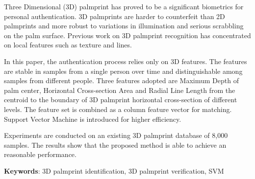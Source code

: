 Three Dimensional (3D) palmprint has proved to be a significant biometrics for personal authentication. 3D palmprints are harder to counterfeit than 2D palmprints and more robust to variations in illumination and serious scrabbling on the palm surface. Previous work on 3D palmprint recognition has concentrated on local features such as texture and lines.

In this paper, the authentication process relies only on 3D features. The features are stable in samples from a single person over time and distinguishable among samples from different people. Three features adopted are Maximum Depth of palm center, Horizontal Cross-section Area and Radial Line Length from the centroid to the boundary of 3D palmprint horizontal cross-section of different levels. The feature set is combined as a column feature vector for matching. Support Vector Machine is introduced for higher efficiency.

Experiments are conducted on an existing 3D palmprint database of 8,000 samples. The results show that the proposed method is able to achieve an reasonable performance.


\textbf{Keywords}: 3D palmprint identification, 3D palmprint verification, SVM